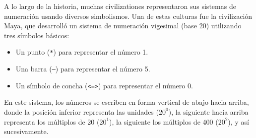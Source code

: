 
A lo largo de la historia, muchas civilizationes representaron sus sistemas de numeraci\'on usando diversos simbolismos. Una de estas culturas fue la civilización Maya, que desarrolló un sistema de numeración vigesimal (base 20) utilizando tres símbolos básicos:

\begin{itemize}
    \item Un punto (\texttt{*}) para representar el número 1.
    \item Una barra (\texttt{---}) para representar el número 5.
    \item Un símbolo de concha (\texttt{<=>}) para representar el número 0.
\end{itemize}

En este sistema, los números se escriben en forma vertical de abajo hacia arriba, donde la posición inferior representa las unidades ($20^0$), la siguiente hacia arriba representa los múltiplos de 20 ($20^1$), la siguiente los múltiplos de 400 ($20^2$), y así sucesivamente.

